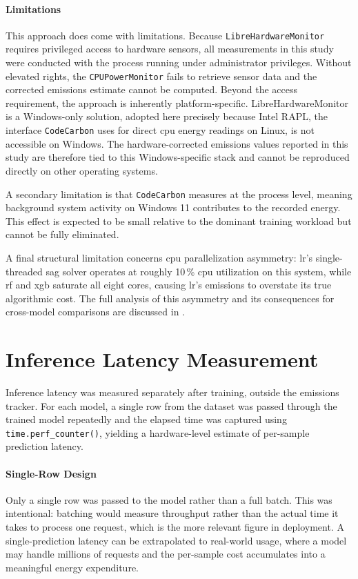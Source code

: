 \paragraph{Limitations}
This approach does come with limitations. Because \texttt{LibreHardwareMonitor} requires privileged access to hardware sensors, all measurements in this study were conducted with the process running under administrator privileges. Without elevated rights, the \texttt{CPUPowerMonitor} fails to retrieve sensor data and the corrected emissions estimate cannot be computed. Beyond the access requirement, the approach is inherently platform-specific. LibreHardwareMonitor is a Windows-only solution, adopted here precisely because Intel RAPL, the interface \texttt{CodeCarbon} uses for direct \gls{cpu} energy readings on Linux, is not accessible on Windows. The hardware-corrected emissions values reported in this study are therefore tied to this Windows-specific stack and cannot be reproduced directly on other operating systems.

A secondary limitation is that \texttt{CodeCarbon} measures at the process level, meaning background system activity on Windows 11 contributes to the recorded energy. This effect is expected to be small relative to the dominant training workload but cannot be fully eliminated.

A final structural limitation concerns \gls{cpu} parallelization asymmetry: \gls{lr}'s single-threaded \gls{sag} solver operates at roughly 10\,\% \gls{cpu} utilization on this system, while \gls{rf} and \gls{xgb} saturate all eight cores, causing \gls{lr}'s emissions to overstate its true algorithmic cost. The full analysis of this asymmetry and its consequences for cross-model comparisons are discussed in .

\section{Inference Latency Measurement}
\label{implementation_inference}

Inference latency was measured separately after training, outside the emissions tracker. For each model, a single row from the dataset was passed through the trained model repeatedly and the elapsed time was captured using \texttt{time.perf\_counter()}, yielding a hardware-level estimate of per-sample prediction latency.

\paragraph{Single-Row Design}
Only a single row was passed to the model rather than a full batch. This was intentional: batching would measure throughput rather than the actual time it takes to process one request, which is the more relevant figure in deployment. A single-prediction latency can be extrapolated to real-world usage, where a model may handle millions of requests and the per-sample cost accumulates into a meaningful energy expenditure.

